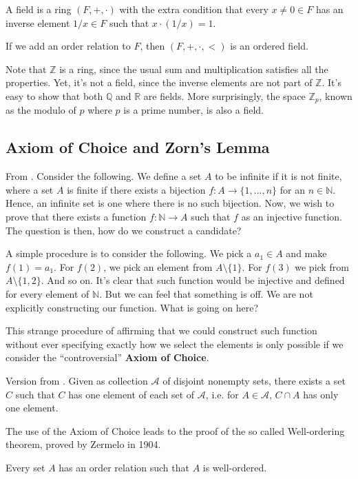 \begin{definition}[Field]
	A field is a ring $(F, +, \cdot)$ with the extra condition that
	every $x \neq 0 \in F$ has  an inverse element $1/x \in F$ such that $x \cdot (1/x) = 1$.

	If we add an order relation to $F$, then $(F, +, \cdot, <)$ is an ordered field.
\end{definition}

\begin{example}
	Note that $\mathbb Z$ is a ring, since the usual sum and multiplication
	satisfies all the properties. Yet, it's not a field, since the inverse
	elements are not part of $\mathbb Z$. It's easy to show
	that both $\mathbb Q$ and $\mathbb R$ are fields. More surprisingly,
	the space $\mathbb Z_{p}$, known as the modulo of $p$ where $p$ is a prime number, is also
	a field.
\end{example}

\subsection{Axiom of Choice and Zorn's Lemma}

From \citet{munkres2018elements}.
Consider the following. We define a set $A$ to be infinite if it is not finite, where
a set $A$ is finite if there exists a bijection $f:A \to \{1,...,n\}$ for an $n \in \mathbb N$.
Hence, an infinite set is one where there is no such bijection.
Now, we wish to prove that there exists a function $f:\mathbb N \to A$ such that
$f$ as an injective function. The question is then, how do we construct a candidate?

A simple procedure is to consider the following. We pick a $a_1 \in A$ and make
$f(1) = a_1$. For $f(2)$, we pick an element from $A \setminus \{1\}$. For $f(3)$
we pick from $A \setminus \{1,2\}$. And so on. It's clear that such function
would be injective and defined for every element of $\mathbb N$. But we can
feel that something is off. We are not explicitly constructing our function.
What is going on here?

This strange procedure of affirming that we could construct such function without
ever specifying exactly how we select the elements is only possible if we
consider the ``controversial'' \textbf{Axiom of Choice}.

\begin{definition}
  Version from \citet{munkres2018elements}. Given as collection $\mathcal A$
  of disjoint nonempty sets, there exists a set $C$ such that $C$
  has one element of each set of $\mathcal A$, i.e. for $A \in \mathcal A$,
  $C \cap A$ has only one element.
\end{definition}

The use of the Axiom of Choice leads to the proof of the so called
Well-ordering theorem, proved by Zermelo in 1904.
\begin{theorem}
  Every set $A$ has an order relation such that $A$ is well-ordered.
\end{theorem}


